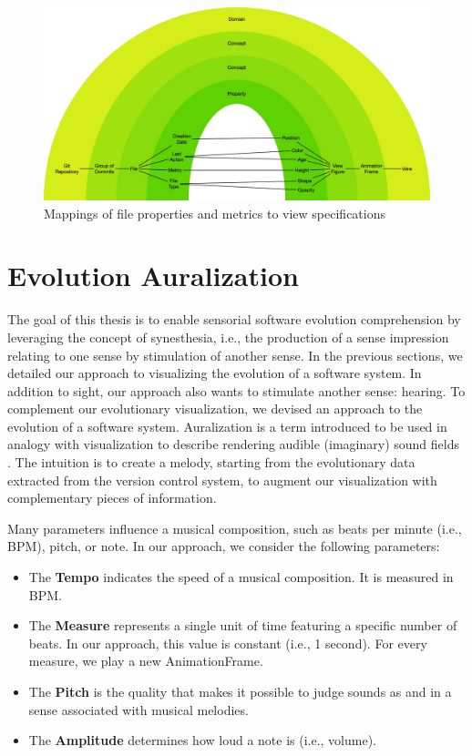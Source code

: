 \begin{figure}
    \center
    \includegraphics[width=\textwidth]{ApproachMapping.jpg}
    \caption{Mappings of file properties and metrics to view specifications}
    \label{fig:ApproachMapping}
\end{figure}



\section{Evolution Auralization}
\label{sec:audioApproach}
The goal of this thesis is to enable sensorial software evolution comprehension by leveraging the concept of synesthesia, i.e., the production of a sense impression relating to one sense by stimulation of another sense. In the previous sections, we detailed our approach to visualizing the evolution of a software system. In addition to sight, our approach also wants to stimulate another sense: hearing. To complement our evolutionary visualization, we devised an approach to \emph{} the evolution of a software system. Auralization is a term introduced to be used in analogy with visualization to describe rendering audible (imaginary) sound fields \cite{kleiner1993}. The intuition is to create a melody, starting from the evolutionary data extracted from the version control system, to augment our visualization with complementary pieces of information.


Many parameters influence a musical composition, such as beats per minute (i.e., BPM), pitch, or note. In our approach, we consider the following parameters:

\begin{itemize}
    \item The \textbf{Tempo} indicates the speed of a musical composition. It is measured in BPM. 
    \item The \textbf{Measure} represents a single unit of time featuring a specific number of beats. In our approach, this value is constant (i.e., 1 second). For every measure, we play a new AnimationFrame.
	\item The \textbf{Pitch} is the quality that makes it possible to judge sounds as  and  in a sense associated with musical melodies.
	\item The \textbf{Amplitude} determines how loud a note is (i.e., volume).
\end{itemize}

